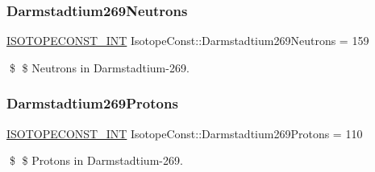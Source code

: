 \subsubsection{\texorpdfstring{Darmstadtium269\+Neutrons}{Darmstadtium269Neutrons}}
{\footnotesize\ttfamily \mbox{\hyperlink{group___isotope_const-_macros_ga5f18360b3e99483a35c32d789e62621c}{I\+S\+O\+T\+O\+P\+E\+C\+O\+N\+S\+T\+\_\+\+I\+NT}} Isotope\+Const\+::\+Darmstadtium269\+Neutrons = 159}

\$ \$ Neutrons in Darmstadtium-\/269. \mbox{\label{group___isotope_const-_darmstadtium-_ds269_gaf17d095cad72706ba32381d72b86b25c}} 
\subsubsection{\texorpdfstring{Darmstadtium269\+Protons}{Darmstadtium269Protons}}
{\footnotesize\ttfamily \mbox{\hyperlink{group___isotope_const-_macros_ga5f18360b3e99483a35c32d789e62621c}{I\+S\+O\+T\+O\+P\+E\+C\+O\+N\+S\+T\+\_\+\+I\+NT}} Isotope\+Const\+::\+Darmstadtium269\+Protons = 110}

\$ \$ Protons in Darmstadtium-\/269. 